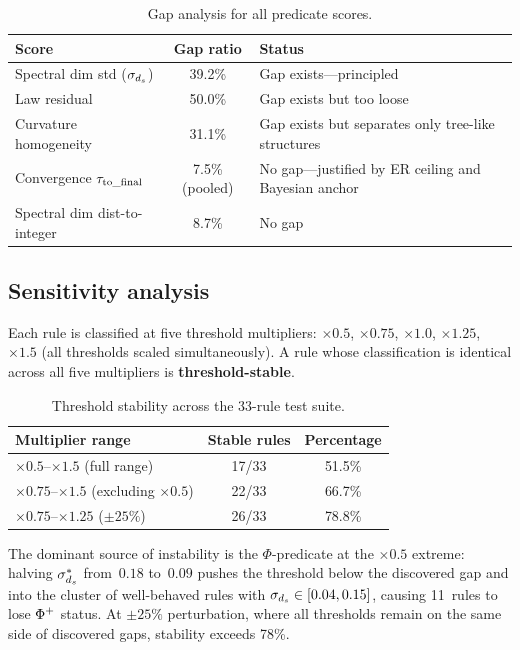 \documentclass{../shared/primo}
\begin{document}
\begin{table}[ht]
\centering
\begin{tabular}{lcl}
\toprule
Score & Gap ratio & Status \\
\midrule
Spectral dim std ($\sigma_{d_s}$) & 39.2\% & Gap exists---principled \\
Law residual & 50.0\% & Gap exists but too loose \\
Curvature homogeneity & 31.1\% & Gap exists but separates only tree-like structures \\
Convergence $\tau_{\mathrm{to\_final}}$ & 7.5\% (pooled) & No gap---justified by ER ceiling and Bayesian anchor \\
Spectral dim dist-to-integer & 8.7\% & No gap \\
\bottomrule
\end{tabular}
\caption{Gap analysis for all predicate scores.}
\label{tab:gaps}
\end{table}

\subsection{Sensitivity analysis}

Each rule is classified at five threshold multipliers: $\times 0.5$, $\times 0.75$, $\times 1.0$, $\times 1.25$, $\times 1.5$ (all thresholds scaled simultaneously). A rule whose classification is identical across all five multipliers is \textbf{threshold-stable}.

\begin{table}[ht]
\centering
\begin{tabular}{lcc}
\toprule
Multiplier range & Stable rules & Percentage \\
\midrule
$\times 0.5$--$\times 1.5$ (full range) & 17/33 & 51.5\% \\
$\times 0.75$--$\times 1.5$ (excluding $\times 0.5$) & 22/33 & 66.7\% \\
$\times 0.75$--$\times 1.25$ ($\pm 25\%$) & 26/33 & 78.8\% \\
\bottomrule
\end{tabular}
\caption{Threshold stability across the 33-rule test suite.}
\label{tab:sensitivity}
\end{table}

The dominant source of instability is the $\Phi$-predicate at the $\times 0.5$ extreme: halving $\sigma^*_{d_s}$ from~$0.18$ to~$0.09$ pushes the threshold below the discovered gap and into the cluster of well-behaved rules with $\sigma_{d_s} \in [0.04, 0.15]$, causing 11~rules to lose $\Phi\textsuperscript{+}$ status. At $\pm 25\%$ perturbation, where all thresholds remain on the same side of discovered gaps, stability exceeds 78\%.
\end{document}
